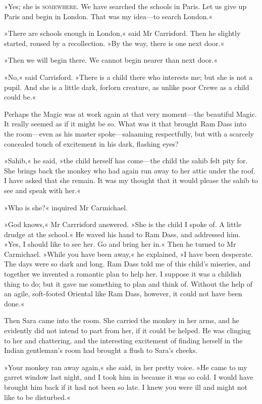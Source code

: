 »Yes; she is \textsc{somewhere}. We have searched the schools in Paris. Let us give up Paris and begin in London. That was my idea—to search London.«

»There are schools enough in London,« said Mr Carrisford. Then he slightly started, roused by a recollection. »By the way, there is one next door.«

»Then we will begin there. We cannot begin nearer than next door.«

»No,« said Carrisford. »There is a child there who interests me; but she is not a pupil. And she is a little dark, forlorn creature, as unlike poor Crewe as a child could be.«

Perhaps the Magic was at work again at that very moment—the beautiful Magic. It really seemed as if it might be so. What was it that brought Ram Dass into the room—even as his master spoke—salaaming respectfully, but with a scarcely concealed touch of excitement in his dark, flashing eyes?

»Sahib,« he said, »the child herself has come—the child the sahib felt pity for. She brings back the monkey who had again run away to her attic under the roof. I have asked that she remain. It was my thought that it would please the sahib to see and speak with her.«

»Who is she?« inquired Mr Carmichael.

»God knows,« Mr Carrrisford answered. »She is the child I spoke of. A little drudge at the school.« He waved his hand to Ram Dass, and addressed him. »Yes, I should like to see her. Go and bring her in.« Then he turned to Mr Carmichael. »While you have been away,« he explained, »I have been desperate. The days were so dark and long. Ram Dass told me of this child's miseries, and together we invented a romantic plan to help her. I suppose it was a childish thing to do; but it gave me something to plan and think of. Without the help of an agile, soft-footed Oriental like Ram Dass, however, it could not have been done.«

Then Sara came into the room. She carried the monkey in her arms, and he evidently did not intend to part from her, if it could be helped. He was clinging to her and chattering, and the interesting excitement of finding herself in the Indian gentleman's room had brought a flush to Sara's cheeks.

»Your monkey ran away again,« she said, in her pretty voice. »He came to my garret window last night, and I took him in because it was so cold. I would have brought him back if it had not been so late. I knew you were ill and might not like to be disturbed.«

